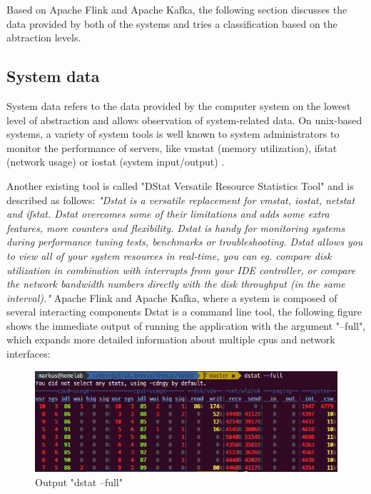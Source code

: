 Based on Apache Flink and Apache Kafka, the following section discusses the data provided
by both of the systems and tries a classification based on the abtraction levels.

\subsection{System data}

System data refers to the data provided by the computer system on the lowest level of
abstraction and allows observation of system-related data. On unix-based systems, a
variety of system tools is well known to system administrators to monitor the performance
of servers, like vmstat (memory utilization), ifstat (network usage) or iostat (system
input/output) \cite{Hoeb12}.

Another existing tool is called "DStat Versatile Resource Statistics Tool" and is described
as follows: \textit{"Dstat is a versatile replacement for vmstat, iostat, netstat and ifstat. Dstat
overcomes some of their limitations and adds some extra features, more counters and flexibility.
Dstat is handy for monitoring systems during performance tuning tests, benchmarks
or troubleshooting. Dstat allows you to view all of your system resources in real-time, you
can eg. compare disk utilization in combination with interrupts from your IDE controller,
or compare the network bandwidth numbers directly with the disk throughput (in the same
interval)."}\cite{Wieers16}
Apache Flink and Apache Kafka, where a system is
composed of several interacting components
Dstat is a command line tool, the following figure shows the immediate output of running
the application with the argument "--full", which expands more detailed information about
multiple cpus and network interfaces:

\begin{figure}[H]
	\centering
	\includegraphics[width=1.0\textwidth]{../images/06-dstat-full.png}
	\caption{Output "dstat --full"}
	\label{dstat-output}
\end{figure}

